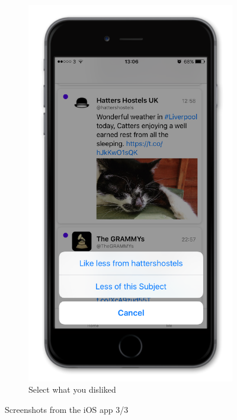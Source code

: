 \documentclass{article}
\begin{document}
\begin{figure}[H]
\begin{subfigure}[b]{0.48\textwidth}
        \includegraphics[width=\textwidth]{iphone_10_dislike2}
        \caption{Select what you disliked}
    \end{subfigure}
    
    \vspace{1em}
    
    \caption{Screenshots from the iOS app 3/3}
\end{figure}
\end{document}

